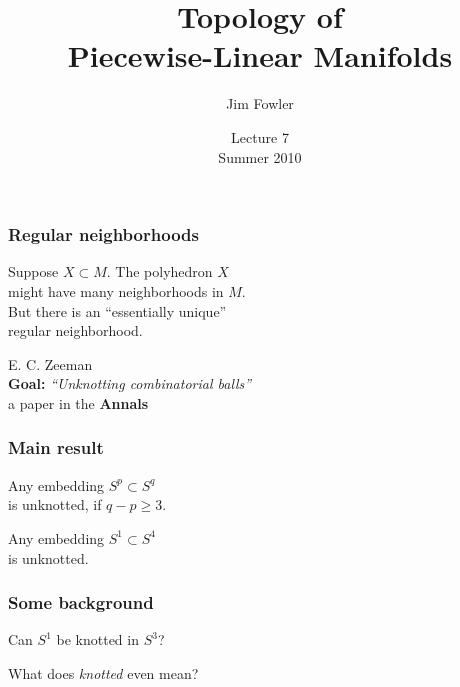 \documentclass[14pt]{beamer}
\title{Topology of  \\ Piecewise-Linear Manifolds}
\author{Jim Fowler}
\date{Lecture 7 \\ Summer 2010}
\newcommand{\setbackgroundpicture}[1]{%
\usebackgroundtemplate{
\begin{pgfpicture}{0in}{0in}{\paperwidth}{\paperheight}
\pgfputat{\pgfxy(0,0)}{\texttt{[image: \#1]}}
\color{white}
\pgfsetfillopacity{0.8}
\pgfrect[fill]{\pgfxy(0,0)}{\pgfpoint{\paperwidth}{\paperheight}}
\end{pgfpicture}
}
}
\newcommand{\clearbackgroundpicture}{\usebackgroundtemplate{}}
\begin{document}
\begin{frame}
\maketitle
\end{frame}

\begin{frame}
  \frametitle{Regular neighborhoods}
  
  \large
  Suppose $X \subset M$.
  \pause
  The polyhedron $X$ \\
  might have many neighborhoods in $M$. \\
  \vspace{1ex}\pause
  But there is an ``essentially unique'' \\
  regular neighborhood.
\end{frame}

\begin{frame}
 \vfill
  \begin{center}
   \Huge E. C. Zeeman \\
   \pause\vfill
   {\normalsize \textbf{Goal:} \textit{``Unknotting combinatorial balls''}
     \\\pause
     a paper in the \textbf{Annals}
     }
  \end{center}
  \vfill
\end{frame}

\setbackgroundpicture{Nf_knots.png}
\begin{frame}
  \frametitle{Main result}

\Large
  \begin{theorem}
    Any embedding $S^p \subset S^q$ \\is unknotted, if $q - p \geq 3$.
  \end{theorem}
\pause
  \begin{corollary}
        Any embedding $S^1 \subset S^{4}$ \\is unknotted.
  \end{corollary}

\end{frame}
\clearbackgroundpicture

\begin{frame}
  \frametitle{Some background}

  Can $S^1$ be knotted in $S^3$?

  \pause\vfill
  What does \textit{knotted} even mean?
\end{frame}
\end{document}
